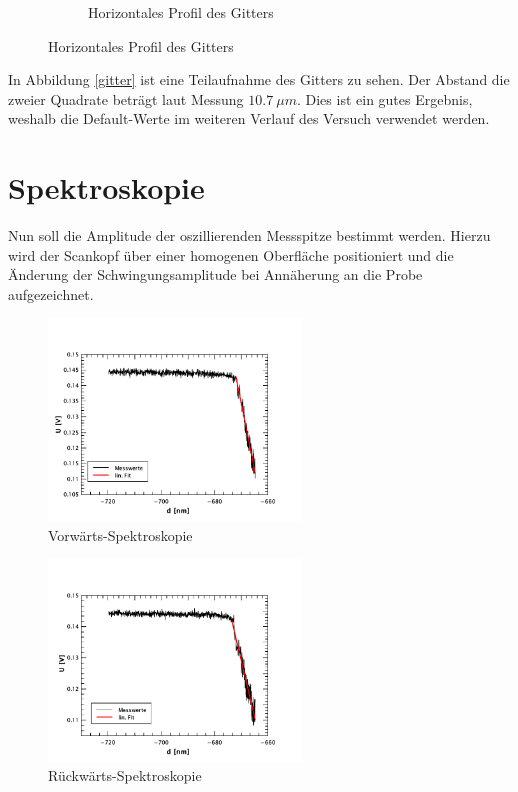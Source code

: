 \begin{figure}
\begin{subfigure}[hb]{0.4\textwidth}
        \caption{Horizontales Profil des Gitters}
    \end{subfigure}
\end{figure}
In Abbildung \ref{gitter} ist eine Teilaufnahme des Gitters zu sehen. Der Abstand die 
zweier Quadrate beträgt laut Messung $\SI{10,7}{\mu m}$. Dies ist ein gutes 
Ergebnis, weshalb die Default-Werte im weiteren Verlauf des Versuch verwendet 
werden.

    \section{Spektroskopie}

Nun soll die Amplitude der oszillierenden Messspitze bestimmt werden. Hierzu wird
der Scankopf über einer homogenen Oberfläche positioniert und die Änderung der 
Schwingungsamplitude bei Annäherung an die Probe aufgezeichnet.
\begin{figure}[hp]
    \centering
    \includegraphics[width=0.6\textwidth]{Mess/spek_forw.pdf}
    \caption{Vorwärts-Spektroskopie}
    \label{spek_forw}
\end{figure}
\begin{figure}[hp]
    \centering
    \includegraphics[width=0.6\textwidth]{Mess/spek_backw.pdf}
    \caption{Rückwärts-Spektroskopie}
    \label{spek_backw}
\end{figure}
